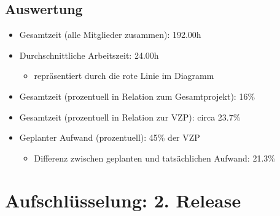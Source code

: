 \documentclass[11pt,a4paper]{report}
\begin{document}
\subsection{Auswertung}

\begin{itemize}
\item Gesamtzeit (alle Mitglieder zusammen): 192.00h
\item Durchschnittliche Arbeitszeit: 24.00h
	\begin{itemize}
	\item repräsentiert durch die rote Linie im Diagramm
	\end{itemize}
\item Gesamtzeit (prozentuell in Relation zum Gesamtprojekt): 16\%
\item Gesamtzeit (prozentuell in Relation zur VZP): circa 23.7\%
\item Geplanter Aufwand (prozentuell): 45\% der VZP
	\begin{itemize}
	\item Differenz zwischen geplanten und tatsächlichen Aufwand: 21.3\%
	\end{itemize}
\end{itemize}

\newpage

\section{Aufschlüsselung: 2. Release}

\end{document}
